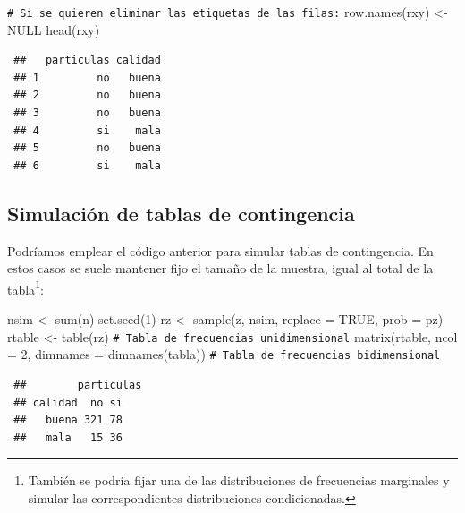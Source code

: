 \documentclass[
  10pt,
]{book}
\newenvironment{Shaded}{\begin{snugshade}}{\end{snugshade}}
\newcommand{\AttributeTok}[1]{\textcolor[rgb]{0.77,0.63,0.00}{#1}}
\newcommand{\CommentTok}[1]{\textcolor[rgb]{0.56,0.35,0.01}{\textit{#1}}}
\newcommand{\ConstantTok}[1]{\textcolor[rgb]{0.00,0.00,0.00}{#1}}
\newcommand{\DecValTok}[1]{\textcolor[rgb]{0.00,0.00,0.81}{#1}}
\newcommand{\FunctionTok}[1]{\textcolor[rgb]{0.00,0.00,0.00}{#1}}
\newcommand{\NormalTok}[1]{#1}
\newcommand{\OtherTok}[1]{\textcolor[rgb]{0.56,0.35,0.01}{#1}}
\theoremstyle{break}
\theoremstyle{nonumberplain}
\renewcommand{\CommentTok}[1]{\textcolor[rgb]{0.41,0.41,0.41}{\texttt{#1}}}
\let\oldfootnote\footnote
\renewcommand\footnote[1]{\oldfootnote{\hspace{2mm}#1}}
\begin{document}
\begin{Shaded}
\begin{Highlighting}[]
\CommentTok{\# Si se quieren eliminar las etiquetas de las filas:}
\FunctionTok{row.names}\NormalTok{(rxy) }\OtherTok{\textless{}{-}} \ConstantTok{NULL}
\FunctionTok{head}\NormalTok{(rxy)}
\end{Highlighting}
\end{Shaded}

\begin{verbatim}
 ##   particulas calidad
 ## 1         no   buena
 ## 2         no   buena
 ## 3         no   buena
 ## 4         si    mala
 ## 5         no   buena
 ## 6         si    mala
\end{verbatim}

\hypertarget{simconting}{%
\subsection{Simulación de tablas de contingencia}\label{simconting}}

Podríamos emplear el código anterior para simular tablas de contingencia.
En estos casos se suele mantener fijo el tamaño de la muestra, igual al total de la tabla\footnote{También se podría fijar una de las distribuciones de frecuencias marginales y simular las correspondientes distribuciones condicionadas.}:

\begin{Shaded}
\begin{Highlighting}[]
\NormalTok{nsim }\OtherTok{\textless{}{-}} \FunctionTok{sum}\NormalTok{(n)}
\FunctionTok{set.seed}\NormalTok{(}\DecValTok{1}\NormalTok{)}
\NormalTok{rz }\OtherTok{\textless{}{-}} \FunctionTok{sample}\NormalTok{(z, nsim, }\AttributeTok{replace =} \ConstantTok{TRUE}\NormalTok{, }\AttributeTok{prob =}\NormalTok{ pz)}
\NormalTok{rtable }\OtherTok{\textless{}{-}} \FunctionTok{table}\NormalTok{(rz) }\CommentTok{\# Tabla de frecuencias unidimensional}
\FunctionTok{matrix}\NormalTok{(rtable, }\AttributeTok{ncol =} \DecValTok{2}\NormalTok{, }\AttributeTok{dimnames =} \FunctionTok{dimnames}\NormalTok{(tabla)) }\CommentTok{\# Tabla de frecuencias bidimensional}
\end{Highlighting}
\end{Shaded}

\begin{verbatim}
 ##        particulas
 ## calidad  no si
 ##   buena 321 78
 ##   mala   15 36
\end{verbatim}
\end{document}
